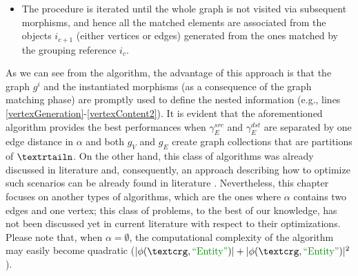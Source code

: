 \begin{itemize}
\item The procedure is iterated until the whole graph is not visited via subsequent morphisms, and hence all the matched elements are associated from the objects $i_{c+1}$ (either vertices or edges) generated from the ones matched by the grouping reference $i_c$.
\end{itemize}

As we can see from the algorithm, the advantage of this approach is that the graph $g^i$ and the instantiated morphisms (as a consequence of the graph matching phase) are promptly used to define the nested information (e.g., lines \ref{vertexGeneration}-\ref{vertexContent2}). It is evident that the aforementioned algorithm provides the best performances when $\gamma_E^{src}$ and $\gamma_E^{dst}$ are separated by  one edge distance in $\alpha$   and both $g_V$ and $g_E$ create graph collections that are partitions of $\nested$. On the other hand, this class of algorithms was already discussed in literature and, consequently, an approach describing how to optimize such  scenarios can be already found in literature \cite{JunghannsPR17}. Nevertheless, this chapter focuses on another types of algorithms, which are the ones where $\alpha$ contains two edges and one vertex; this class of problems, to the best of our knowledge, has not been discussed yet in current literature with respect to their optimizations. %
 Please note that, when $\alpha=\emptyset$, the computational complexity of the algorithm may easily become quadratic ($|\phi(\ngraph,\ONTA)|+|\phi(\ngraph,\ONTA)|^2$).
